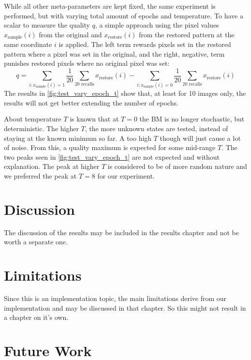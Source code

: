 \documentclass[12pt,twoside]{article}
\theoremstyle{plain}
\theoremstyle{definition}
\theoremstyle{remark}
\begin{document}
While all other meta-parameters are kept fixed, the same experiment is performed, but with varying total amount of epochs and temperature.
To have a scalar to measure the quality $q$, a simple approach using the pixel values $x_\text{sample}(i)$ from the original and $x_\text{restore}(i)$ from the restored pattern at the same coordinate $i$ is applied.
The left term rewards pixels set in the restored pattern where a pixel was set in the original, and the right, negative, term punishes restored pixels where no original pixel was set:
$$q = \sum_{i : x_\text{sample}(i) = 1} \frac1{20}\sum_{\text{20 recalls}}x_\text{restore}(i) - \sum_{i : x_\text{sample}(i) = 0} \frac1{20}\sum_{\text{20 recalls}}x_\text{restore}(i)$$
The results in \cref{fig:test_vary_epoch_t} show that, at least for 10 images only, the results will not get better extending the number of epochs.

About temperature $T$ is known that at $T=0$ the BM is no longer stochastic, but deterministic. The higher $T$, the more unknown states are tested, instead of staying at the known minimum so far. A too high $T$ though will just cause a lot of noise. From this, a quality maximum is expected for some mid-range $T$. The two peaks seen in \cref{fig:test_vary_epoch_t} are not expected and without explanation. The peak at higher $T$ is considered to be of more random nature and we preferred the peak at $T=8$ for our experiment.



\section{Discussion}
\label{sec:discuss}

The discussion of the results may be included in the results chapter and not be worth a separate one. %


\section{Limitations}
\label{sec:limits}

Since this is an implementation topic, the main limitations derive from our implementation and may be discussed in that chapter. So this might not result in a chapter on it's own. %


\section{Future Work}
\label{sec:future}
\end{document}
